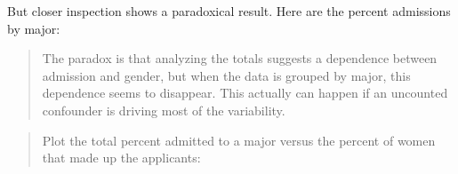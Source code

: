 \documentclass[]{article}
\newenvironment{Shaded}{\begin{snugshade}}{\end{snugshade}}
\newcommand{\DataTypeTok}[1]{\textcolor[rgb]{0.13,0.29,0.53}{#1}}
\newcommand{\DecValTok}[1]{\textcolor[rgb]{0.00,0.00,0.81}{#1}}
\newcommand{\KeywordTok}[1]{\textcolor[rgb]{0.13,0.29,0.53}{\textbf{#1}}}
\newcommand{\NormalTok}[1]{#1}
\newcommand{\OperatorTok}[1]{\textcolor[rgb]{0.81,0.36,0.00}{\textbf{#1}}}
\newcommand{\StringTok}[1]{\textcolor[rgb]{0.31,0.60,0.02}{#1}}
\begin{document}
But closer inspection shows a paradoxical result. Here are the percent
admissions by major:

\begin{Shaded}
\end{Shaded}

\begin{quote}
The paradox is that analyzing the totals suggests a dependence between
admission and gender, but when the data is grouped by major, this
dependence seems to disappear. This actually can happen if an uncounted
confounder is driving most of the variability.
\end{quote}

\begin{quote}
Plot the total percent admitted to a major versus the percent of women
that made up the applicants:
\end{quote}

\begin{Shaded}
\end{Shaded}
\end{document}
